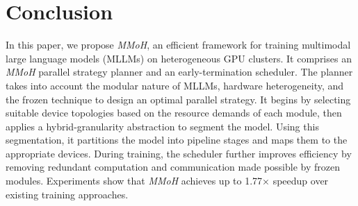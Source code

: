 \documentclass[conference]{IEEEtran}
\begin{document}


\section{Conclusion}

In this paper, we propose \textit{MMoH}, an efficient framework for training multimodal large language models (MLLMs) on heterogeneous GPU clusters.
It comprises an \textit{MMoH} parallel strategy planner and an early-termination scheduler. The planner takes into account the modular nature of MLLMs, hardware heterogeneity, and the frozen technique to design an optimal parallel strategy. It begins by selecting suitable device topologies based on the resource demands of each module, then applies a hybrid-granularity abstraction to segment the model. Using this segmentation, it partitions the model into pipeline stages and maps them to the appropriate devices. During training, the scheduler further improves efficiency by removing redundant computation and communication made possible by frozen modules. Experiments show that \textit{MMoH} achieves up to 1.77× speedup over existing training approaches.
\end{document}
